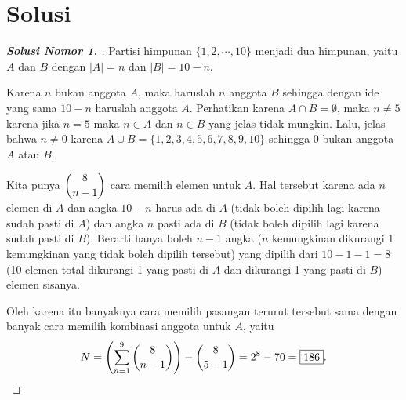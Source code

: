 \newpage
\section{Solusi}
\begin{proof}[\textbf{Solusi Nomor 1. }]
Partisi himpunan $\{1,2,\cdots,10\}$ menjadi dua himpunan, yaitu $A$ dan $B$ dengan $|A|=n$ dan $|B|=10-n$.

Karena $n$ bukan anggota $A$, maka haruslah $n$ anggota $B$ sehingga dengan ide yang sama $10-n$ haruslah anggota $A$. Perhatikan karena $A \cap B = \emptyset$, maka $n \neq 5$ karena jika $n=5$ maka $n \in A$ dan $n \in B$ yang jelas tidak mungkin. Lalu, jelas bahwa $n \neq 0$ karena $A \cup B = \{1,2,3,4,5,6,7,8,9,10\}$ sehingga 0 bukan anggota $A$ atau $B$.

Kita punya $\dbinom{8}{n-1}$ cara memilih elemen untuk $A$. Hal tersebut karena ada $n$ elemen di $A$ dan angka $10-n$ harus ada di $A$ (tidak boleh dipilih lagi karena sudah pasti di $A$) dan angka $n$ pasti ada di $B$ (tidak boleh dipilih lagi karena sudah pasti di $B$). Berarti hanya boleh $n-1$ angka ($n$ kemungkinan dikurangi 1 kemungkinan yang tidak boleh dipilih tersebut) yang dipilih dari $10-1-1=8$ (10 elemen total dikurangi 1 yang pasti di $A$ dan dikurangi 1 yang pasti di $B$) elemen sisanya.

Oleh karena itu banyaknya cara memilih pasangan terurut tersebut sama dengan banyak cara memilih kombinasi anggota untuk $A$, yaitu $$N=\left(\sum_{n=1}^{9} \dbinom{8}{n-1}\right) - \dbinom{8}{5-1}=2^{8}-70= \boxed{186}.$$

\end{proof}

